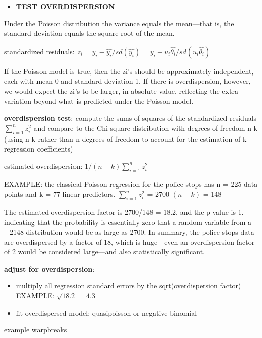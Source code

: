 \documentclass[
]{article}
\newenvironment{Shaded}{\begin{snugshade}}{\end{snugshade}}
\newcommand{\KeywordTok}[1]{\textcolor[rgb]{0.13,0.29,0.53}{\textbf{#1}}}
\newcommand{\NormalTok}[1]{#1}
\newcommand{\OperatorTok}[1]{\textcolor[rgb]{0.81,0.36,0.00}{\textbf{#1}}}
\providecommand{\tightlist}{%
  \setlength{\itemsep}{0pt}\setlength{\parskip}{0pt}}
\begin{document}
\begin{itemize}
\tightlist
\item
  \textbf{TEST OVERDISPERSION}
\end{itemize}

Under the Poisson distribution the variance equals the mean---that is,
the standard deviation equals the square root of the mean.

standardized residuals:
\(z_i= y_i-\hat{y_i}/sd(\hat{y_i})= y_i-u_i\hat{\theta_i} /sd(u_i\hat{\theta_i})\)

If the Poisson model is true, then the zi's should be approximately
independent, each with mean 0 and standard deviation 1. If there is
overdispersion, however, we would expect the zi's to be larger, in
absolute value, reflecting the extra variation beyond what is predicted
under the Poisson model.

\textbf{overdispersion test}: compute the sums of squares of the
standardized residuals \(\sum_{i=1}^n z_i^2\) and compare to the
Chi-square distribution with degrees of freedom n-k (using n-k rather
than n degrees of freedom to account for the estimation of k regression
coefficients)

estimated overdispersion: \(1/(n-k) \sum_{i=1}^n z_i^2\)

EXAMPLE: the classical Poisson regression for the police stops has n =
225 data points and k = 77 linear predictors. \(\sum_{i=1}^n z_i^2\) =
2700 \((n-k)\) = 148

The estimated overdispersion factor is 2700/148 = 18.2, and the p-value
is 1. indicating that the probability is essentially zero that a random
variable from a +2148 distribution would be as large as 2700. In
summary, the police stops data are overdispersed by a factor of 18,
which is huge---even an overdispersion factor of 2 would be considered
large---and also statistically significant.

\textbf{adjust for overdispersion}:

\begin{itemize}
\item
  multiply all regression standard errors by the sqrt(overdispersion
  factor) EXAMPLE: \(\sqrt{18.2}= 4.3\)
\item
  fit overdispersed model: quasipoisson or negative binomial
\end{itemize}

example warpbreaks

\begin{Shaded}
\end{Shaded}
\end{document}
